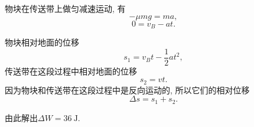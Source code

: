 \documentclass[11pt,a4paper]{ctexart}
\begin{document}
物块在传送带上做匀减速运动, 有
\setlength{\abovedisplayskip}{0pt}
\setlength{\belowdisplayskip}{0pt}
\begin{equation*}
	-\mu mg = ma,
	\tag{iii}
\end{equation*}
\begin{equation*}
	0 = v_B-at.
	\tag{iv}
\end{equation*}

物块相对地面的位移
\begin{equation*}
	s_1 = v_Bt-\frac12 at^2,
	\tag{v}
\end{equation*}
传送带在这段过程中相对地面的位移
\begin{equation*}
	s_2 = vt.
	\tag{vi}
\end{equation*}
因为物块和传送带在这段过程中是反向运动的, 所以它们的相对位移
\begin{equation*}
	\Delta s = s_1 + s_2.
	\tag{vii}
\end{equation*}

由此解出$\Delta W = 36\ \mathrm{J}$.
\end{document}
